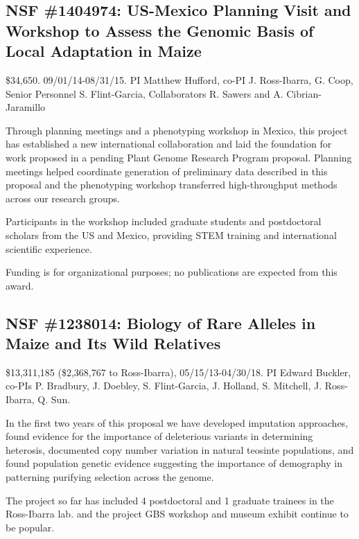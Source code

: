 \subsection*{NSF \#1404974: US-Mexico Planning Visit and Workshop to Assess the Genomic Basis of Local Adaptation in Maize} 
\$34,650. 09/01/14-08/31/15. PI Matthew Hufford, co-PI J. Ross-Ibarra, G. Coop, Senior Personnel S. Flint-Garcia, Collaborators R. Sawers and A. Cibrian-Jaramillo
\par{} Through planning meetings and a phenotyping workshop in Mexico, this project has established a new international collaboration and laid the foundation for work proposed in a pending Plant Genome Research Program proposal. Planning meetings helped coordinate generation of preliminary data described in this proposal and the phenotyping workshop transferred high-throughput methods across our research groups.
\par{} Participants in the  workshop included graduate students and postdoctoral scholars from the US and Mexico, providing STEM training and international scientific experience.
\par{} Funding is for organizational purposes; no publications are expected from this award.

\subsection*{NSF \#1238014: Biology of Rare Alleles in Maize and Its Wild Relatives} 
\$13,311,185 (\$2,368,767 to Ross-Ibarra), 05/15/13-04/30/18. PI Edward Buckler, co-PIs P. Bradbury, J. Doebley,  S. Flint-Garcia, J. Holland,  S. Mitchell, J. Ross-Ibarra, Q. Sun.
\par{} In the first two years of this proposal we have developed imputation approaches, found evidence for the importance of deleterious variants in determining heterosis, documented copy number variation in natural teosinte populations, and found population genetic evidence suggesting the importance of demography in patterning purifying selection across the genome. 
\par{} The project so far has included 4 postdoctoral and 1 graduate trainees in the Ross-Ibarra lab. and the project GBS workshop and museum exhibit continue to be popular. 
\par{} \citet{tiffin2014advances, Takuno15062015, da2015origin, hake2015genetic, makarevitch2015transposable} 

